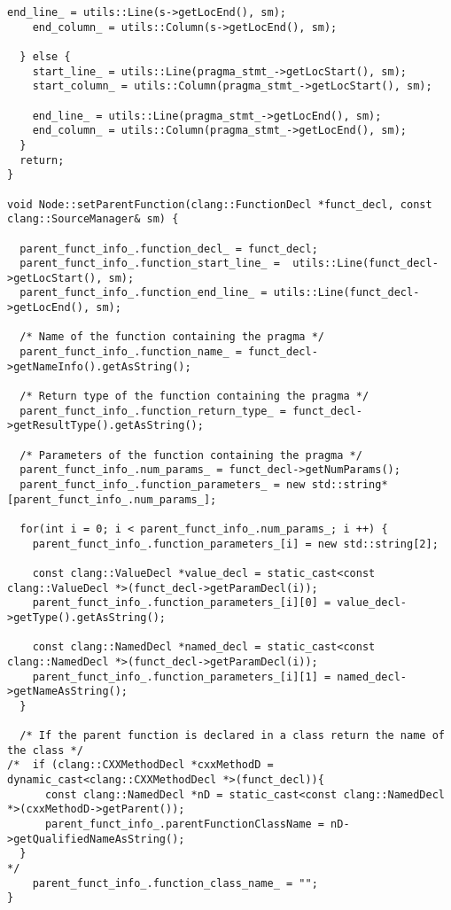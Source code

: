 \documentclass[a4paper,10pt,twoside]{book}
\begin{document}
\begin{lstlisting}[language=CCC, caption=pragma\_handler/Node.cpp]
    end_line_ = utils::Line(s->getLocEnd(), sm);
    end_column_ = utils::Column(s->getLocEnd(), sm);

  } else {
    start_line_ = utils::Line(pragma_stmt_->getLocStart(), sm);
    start_column_ = utils::Column(pragma_stmt_->getLocStart(), sm);

    end_line_ = utils::Line(pragma_stmt_->getLocEnd(), sm);
    end_column_ = utils::Column(pragma_stmt_->getLocEnd(), sm);
  }
  return;
}

void Node::setParentFunction(clang::FunctionDecl *funct_decl, const clang::SourceManager& sm) {
  
  parent_funct_info_.function_decl_ = funct_decl;
  parent_funct_info_.function_start_line_ =  utils::Line(funct_decl->getLocStart(), sm);
  parent_funct_info_.function_end_line_ = utils::Line(funct_decl->getLocEnd(), sm);
  
  /* Name of the function containing the pragma */
  parent_funct_info_.function_name_ = funct_decl->getNameInfo().getAsString();

  /* Return type of the function containing the pragma */
  parent_funct_info_.function_return_type_ = funct_decl->getResultType().getAsString();

  /* Parameters of the function containing the pragma */
  parent_funct_info_.num_params_ = funct_decl->getNumParams();
  parent_funct_info_.function_parameters_ = new std::string*[parent_funct_info_.num_params_];
  
  for(int i = 0; i < parent_funct_info_.num_params_; i ++) {
    parent_funct_info_.function_parameters_[i] = new std::string[2];
    
    const clang::ValueDecl *value_decl = static_cast<const clang::ValueDecl *>(funct_decl->getParamDecl(i));
    parent_funct_info_.function_parameters_[i][0] = value_decl->getType().getAsString();

    const clang::NamedDecl *named_decl = static_cast<const clang::NamedDecl *>(funct_decl->getParamDecl(i));            
    parent_funct_info_.function_parameters_[i][1] = named_decl->getNameAsString();
  }

  /* If the parent function is declared in a class return the name of the class */
/*  if (clang::CXXMethodDecl *cxxMethodD = dynamic_cast<clang::CXXMethodDecl *>(funct_decl)){
      const clang::NamedDecl *nD = static_cast<const clang::NamedDecl *>(cxxMethodD->getParent());            
      parent_funct_info_.parentFunctionClassName = nD->getQualifiedNameAsString();
  }
*/
    parent_funct_info_.function_class_name_ = "";
}


\end{lstlisting}
\end{document}
